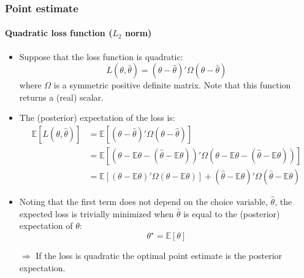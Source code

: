 \documentclass[10pt,slidestop]{beamer}
\begin{document}
\begin{frame}
  \frametitle{Point estimate}
  \framesubtitle{Quadratic loss function ($L_2$ norm)}
  \begin{itemize}
  \item Suppose that the loss function is quadratic:
    \[
    L(\theta,\widehat{\theta}) = (\theta-\widehat{\theta})'\Omega(\theta-\widehat{\theta})
    \]
    where $\Omega$ is a symmetric positive definite matrix. Note that
    this function returns a (real) scalar.
    \bigskip
  \item The (posterior) expectation of the loss is:
    \medskip
    {\tiny\[
    \begin{split}
      \mathbb  E \left[L(\theta,\widehat{\theta})\right] &=
      \mathbb  E \left[(\theta-\widehat{\theta})'\Omega(\theta-\widehat{\theta})\right]\\
      &= \mathbb  E \left[\left(\theta-\mathbb E\theta-\left(\widehat{\theta}-\mathbb E\theta\right)\right)'\Omega\left(\theta-\mathbb E\theta-\left(\widehat{\theta}-\mathbb E\theta\right)\right)\right]\\
      &= \mathbb  E \left[\left(\theta-\mathbb E\theta\right)'\Omega\left(\theta-\mathbb E\theta\right)\right]+(\widehat{\theta}-\mathbb E\theta)'\Omega(\widehat{\theta}-\mathbb E\theta)
    \end{split}
    \]}
  \bigskip
  \item Noting that the first term does not depend on the choice
    variable, $\widehat{\theta}$, the expected loss is trivially
    minimized when $\widehat{\theta}$ is equal to the (posterior)
    expectation of $\theta$:
    \[
    \theta^{\star} = \mathbb E \left[\theta\right]
    \]
    \item[$\Rightarrow$] If the loss is quadratic the optimal point
      estimate is the posterior expectation.
  \end{itemize}
\end{frame}
\end{document}
